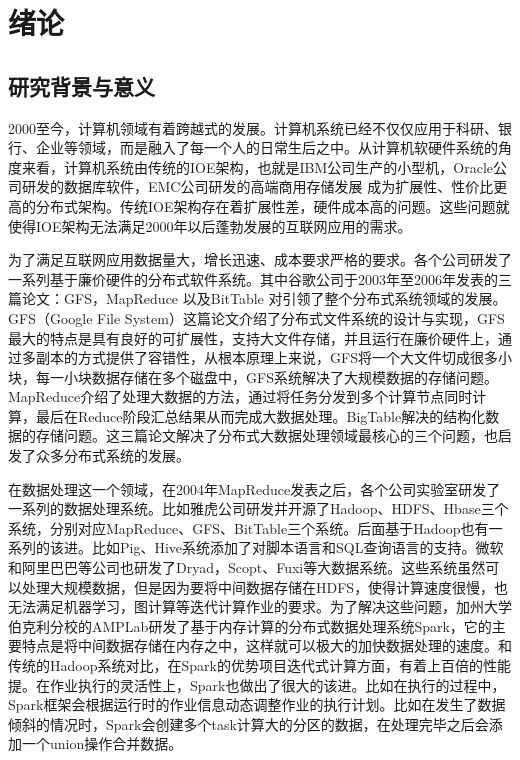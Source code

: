 \chapter{绪论}\label{chap:intro}

\section{研究背景与意义}
2000至今，计算机领域有着跨越式的发展\citet{bhosale2014review}。计算机系统已经不仅仅应用于科研、银行、企业等领域，而是融入了每一个人的日常生后之中。从计算机软硬件系统的角度来看，计算机系统由传统的IOE架构，也就是IBM公司生产的小型机，Oracle公司研发的数据库软件，EMC公司研发的高端商用存储发展 成为扩展性、性价比更高的分布式架构。传统IOE架构存在着扩展性差，硬件成本高的问题。这些问题就使得IOE架构无法满足2000年以后蓬勃发展的互联网应用的需求。

为了满足互联网应用数据量大，增长迅速、成本要求严格的要求。各个公司研发了一系列基于廉价硬件的分布式软件系统。其中谷歌公司于2003年至2006年发表的三篇论文：GFS\cite{ghemawat2003google}，MapReduce \cite{dean2008mapreduce} 以及BitTable \cite{chang2008bigtable} 对引领了整个分布式系统领域的发展。GFS（Google File System）这篇论文介绍了分布式文件系统的设计与实现，GFS最大的特点是具有良好的可扩展性，支持大文件存储，并且运行在廉价硬件上，通过多副本的方式提供了容错性，从根本原理上来说，GFS将一个大文件切成很多小块，每一小块数据存储在多个磁盘中，GFS系统解决了大规模数据的存储问题。MapReduce介绍了处理大数据的方法，通过将任务分发到多个计算节点同时计算，最后在Reduce阶段汇总结果从而完成大数据处理。BigTable解决的结构化数据的存储问题。这三篇论文解决了分布式大数据处理领域最核心的三个问题，也启发了众多分布式系统的发展。

在数据处理这一个领域，在2004年MapReduce发表之后，各个公司实验室研发了一系列的数据处理系统。比如雅虎公司研发并开源了Hadoop\cite{white2012hadoop}、HDFS\cite{shvachko2010hadoop}、Hbase\cite{vora2011hadoop}三个系统，分别对应MapReduce、GFS、BitTable三个系统。后面基于Hadoop也有一系列的该进。比如Pig、Hive\cite{thusoo2009hive}系统添加了对脚本语言和SQL\cite{armbrust2015spark}查询语言的支持。微软和阿里巴巴等公司也研发了Dryad\cite{isard2007dryad}，Scopt\cite{chaiken2008scope}、Fuxi\cite{zhang2014fuxi}等大数据系统。这些系统虽然可以处理大规模数据，但是因为要将中间数据存储在HDFS\cite{shvachko2010hadoop}，使得计算速度很慢，也无法满足机器学习，图计算等迭代计算作业的要求。为了解决这些问题，加州大学伯克利分校的AMPLab研发了基于内存计算的分布式数据处理系统Spark\cite{zaharia2010spark}，它的主要特点是将中间数据存储在内存之中，这样就可以极大的加快数据处理的速度。和传统的Hadoop系统对比，在Spark的优势项目迭代式计算方面，有着上百倍的性能提\cite{gopalani2015comparing}。在作业执行的灵活性上，Spark也做出了很大的该进。比如在执行的过程中，Spark框架会根据运行时的作业信息动态调整作业的执行计划。比如在发生了数据倾斜的情况时，Spark会创建多个task计算大的分区的数据，在处理完毕之后会添加一个union操作合并数据\cite{zaharia2010spark}。

